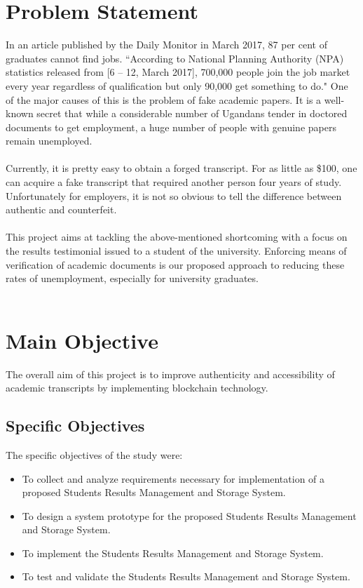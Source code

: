 \section{Problem Statement}
In an article published by the Daily Monitor in March 2017, 87 per cent of graduates cannot find jobs. ``According to National Planning Authority (NPA) statistics released from [6 – 12, March 2017], 700,000 people join the job market every year regardless of qualification but only 90,000 get something to do."\cite{art3} 
One of the major causes of this is the problem of fake academic papers. It is a well-known secret that while a considerable number of Ugandans tender in doctored documents to get employment, a huge number of people with
genuine papers remain unemployed.\\\\
Currently, it is pretty easy to obtain a forged transcript. For as little as \$100, one can acquire a fake transcript that required another person four years of study. Unfortunately for employers, it is not so obvious to tell the difference between authentic and counterfeit.\\\\
This project aims at tackling the above-mentioned shortcoming with a focus on the results testimonial issued to a student of the university. Enforcing means of verification of academic documents is our proposed approach to reducing these rates of unemployment, especially for university graduates.\\\\

\section{Main Objective}
The overall aim of this project is to improve authenticity and accessibility of academic transcripts by implementing blockchain technology.

\subsection{Specific Objectives}
The specific objectives of the study were: 
\begin{itemize}
\item To collect and analyze requirements necessary for implementation of a proposed Students Results Management and Storage System.
\item To design a system prototype for the proposed Students Results Management and Storage System.
\item To implement the Students Results Management and Storage System.
\item To test and validate the Students Results Management and Storage System.
\end{itemize}
